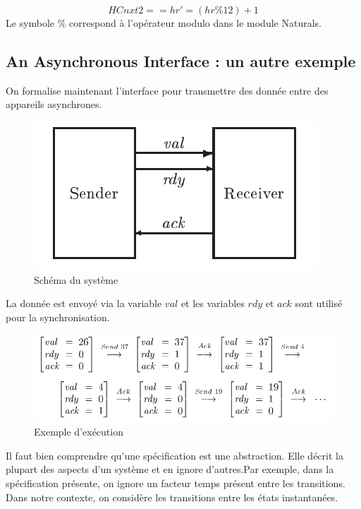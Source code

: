 \documentclass[12pt,a4paper]{article}
\begin{document}
$$ HCnxt2 == hr' = (hr \% 12) + 1 $$
Le symbole $ \% $ correspond à l'opérateur modulo dans le module Naturals. 

\subsection{An Asynchronous Interface : un autre exemple}

On formalise maintenant l'interface pour transmettre des donnée entre des appareils asynchrones.

\begin{figure}[ht]
	\begin{center}
		\includegraphics[scale=0.7]{schema_async.png}
		\caption{Schéma du système}	
	\end{center}
\end{figure}

La donnée est envoyé via la variable $val$ et les variables $rdy$ et $ack$ sont utilisé pour la synchronisation.

\begin{figure}[ht]
	\begin{center}
		\includegraphics[scale=0.7]{exemple_async.png}
		\caption{Exemple d'exécution}	
	\end{center}
\end{figure}

Il faut bien comprendre qu'une spécification est une abstraction. Elle décrit la plupart des aspects d'un système et en ignore d'autres.Par exemple, dans la spécification présente,  on ignore un facteur temps présent entre les transitions. Dans notre contexte, on considère les transitions entre les états instantanées.
\end{document}
